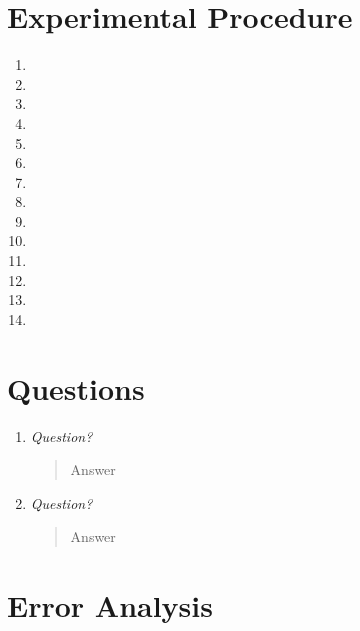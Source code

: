 \documentclass{amsart}
\begin{document}
\section{Experimental Procedure}
\begin{enumerate}
\item 
\item 
\item 
\item 
\item 
\item 
\item 
\item 
\item 
\item 
\item 
\item 
\item 
\item 
\end{enumerate}

\section{}

\medskip 

\pagebreak

\section{Questions}

\begin{enumerate}
\item {\textit{Question?}
\begin{quote}
Answer
\end{quote}}

\item{\textit{Question?}
\begin{quote}
Answer
\end{quote}}

\end{enumerate}

\section{Error Analysis}
\end{document}
